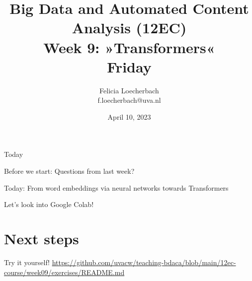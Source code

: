 \documentclass[compress]{beamer}
\begin{document}
\title[Big Data and Automated Content Analysis]{\textbf{Big Data and Automated Content Analysis (12EC)} 
\\Week 9: »Transformers«
\\Friday}
\author[Felicia Loecherbach]{Felicia Loecherbach\\ \footnotesize{f.loecherbach@uva.nl \\}}
\date{April 10, 2023}


\begin{frame}{}
	\titlepage
\end{frame}

\begin{frame}{Today}
	\tableofcontents
\end{frame}
\begin{frame}[standout]
Before we start: Questions from last week?
\end{frame}


\begin{frame}[standout]
Today: From word embeddings via neural networks towards Transformers
\end{frame}




\begin{frame}[standout]
Let's look into Google Colab!
\end{frame}


\section{Next steps}
\begin{frame}[standout]
Try it yourself!
\url{https://github.com/uvacw/teaching-bdaca/blob/main/12ec-course/week09/exercises/README.md}
\end{frame}


\begin{frame}
\printbibliography
\end{frame}
\end{document}
